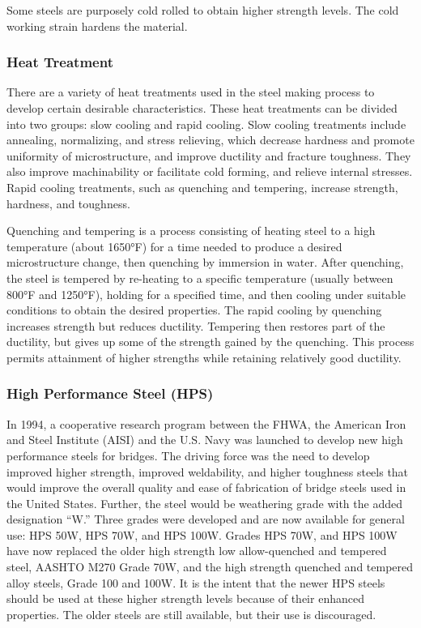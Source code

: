 Some steels are purposely cold rolled to obtain higher strength levels. The cold working strain hardens the material.

\subsubsection{Heat Treatment}
There are a variety of heat treatments used in the steel making process to develop certain desirable characteristics. These heat treatments can be divided into two groups: slow cooling and rapid cooling. Slow cooling treatments include annealing, normalizing, and stress relieving, which decrease hardness and promote uniformity of microstructure, and improve ductility and fracture toughness. They also improve machinability or facilitate cold forming, and relieve internal stresses. Rapid cooling treatments, such as quenching and tempering, increase strength, hardness, and toughness.

Quenching and tempering is a process consisting of heating steel to a high temperature (about 1650°F) for a time needed to produce a desired microstructure change, then quenching by immersion in water. After quenching, the steel is tempered by re-heating to a specific temperature (usually between 800°F and 1250°F), holding for a specified time, and then cooling under suitable conditions to obtain the desired properties. The rapid cooling by quenching increases strength but reduces ductility. Tempering then restores part of the ductility, but gives up some of the strength gained by the quenching. This process permits attainment of higher strengths while retaining relatively good ductility.


\subsubsection{High Performance Steel (HPS)}
\label{subsubsec:hps}
In 1994, a cooperative research program between the FHWA, the American Iron and Steel Institute (AISI) and the U.S. Navy was launched to develop new high performance steels for bridges. The driving force was the need to develop improved higher strength, improved weldability, and higher toughness steels that would improve the overall quality and ease of fabrication of bridge steels used in the United States. Further, the steel would be weathering grade with the added designation “W.” Three grades were developed and are now available for general use: HPS 50W, HPS 70W, and HPS 100W. Grades HPS 70W, and HPS 100W have now replaced the older high strength low allow-quenched and tempered steel, AASHTO M270 Grade 70W, and the high strength quenched and tempered alloy steels, Grade 100 and 100W. It is the intent that the newer HPS steels should be used at these higher strength levels because of their enhanced properties. The older steels are still available, but their use is discouraged.

